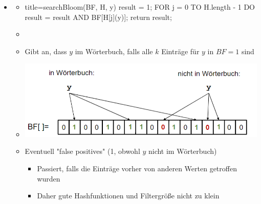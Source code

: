 \documentclass[
    12pt,
    a4paper,
    ngerman,
    color=3b,%
    marginpar=false,
    colorback=false,
    leqno,
]{tudaexercise}
\begin{document}
\begin{itemize}
        \item {}
            \begin{itemize}
                \item[]
                    \begin{ccode}[autogobble]{title={searchBloom(BF, H, y)}}
                    result = 1;
                    FOR j = 0 TO H.length - 1 DO
                        result = result AND BF[H[j](y)];
                    return result;
                    \end{ccode}
                \item[]
                \item Gibt an, dass $y$ im Wörterbuch, falls alle $k$ Einträge für $y$ in $BF=1$ sind
                \item[] \includegraphics[width=12cm]{pictures/bloomSearch.PNG}
                \item Eventuell \string"false positives\string" (1, obwohl $y$ nicht im Wörterbuch)
                    \begin{itemize}
                        \item Passiert, falls die Einträge vorher von anderen Werten getroffen wurden
                        \item Daher gute Hashfunktionen und Filtergrö\ss e nicht zu klein
                    \end{itemize}
            \end{itemize}
    \end{itemize}
    \clearpage
\end{document}
